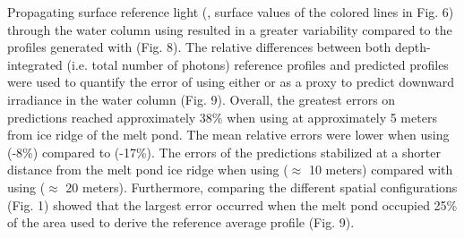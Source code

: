 Propagating surface reference light (\edzero{}, surface values of the colored lines in Fig. 6) through the water column using \ked{} resulted in a greater variability compared to the profiles generated with \klu{} (Fig. 8). The relative differences between both depth-integrated (i.e. total number of photons) reference profiles and predicted profiles were used to quantify the error of using either \ked{} or \klu as a proxy to predict downward irradiance in the water column (Fig. 9).  Overall, the greatest errors on predictions reached approximately 38\% when using \ked{} at approximately 5 meters from ice ridge of the melt pond. The mean relative errors were lower when using \klu{} (-8\%) compared to \ked{} (-17\%). The errors of the predictions stabilized at a shorter distance from the melt pond ice ridge when using \klu{} ($\approx$ 10 meters) compared with using \ked{} ($\approx$ 20 meters). Furthermore, comparing the different spatial configurations (Fig. 1) showed that the largest error occurred when the melt pond occupied 25\% of the area used to derive the reference average profile (Fig. 9).
